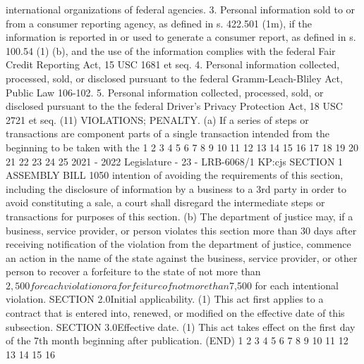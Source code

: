 international organizations of federal agencies.
3. Personal information sold to or from a consumer reporting agency, as defined
in s. 422.501 (1m), if the information is reported in or used to generate a consumer
report, as defined in s. 100.54 (1) (b), and the use of the information complies with
the federal Fair Credit Reporting Act, 15 USC 1681 et seq.
4. Personal information collected, processed, sold, or disclosed pursuant to the
federal Gramm-Leach-Bliley Act, Public Law 106-102.
5. Personal information collected, processed, sold, or disclosed pursuant to the
the federal Driver's Privacy Protection Act, 18 USC 2721 et seq.
(11) VIOLATIONS; PENALTY. (a) If a series of steps or transactions are component
parts of a single transaction intended from the beginning to be taken with the
1
2
3
4
5
6
7
8
9
10
11
12
13
14
15
16
17
18
19
20
21
22
23
24
25
2021 - 2022 Legislature - 23 - LRB-6068/1
KP:cjs
SECTION 1 ASSEMBLY BILL 1050
intention of avoiding the requirements of this section, including the disclosure of
information by a business to a 3rd party in order to avoid constituting a sale, a court
shall disregard the intermediate steps or transactions for purposes of this section.
(b) The department of justice may, if a business, service provider, or person
violates this section more than 30 days after receiving notification of the violation
from the department of justice, commence an action in the name of the state against
the business, service provider, or other person to recover a forfeiture to the state of
not more than $2,500 for each violation or a forfeiture of not more than $7,500 for
each intentional violation.
SECTION 2.0Initial applicability.
(1) This act first applies to a contract that is entered into, renewed, or modified
on the effective date of this subsection.
SECTION 3.0Effective date.
(1) This act takes effect on the first day of the 7th month beginning after
publication.
(END)
1
2
3
4
5
6
7
8
9
10
11
12
13
14
15
16